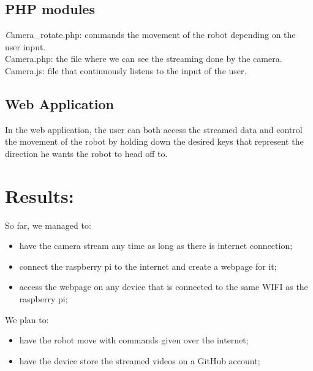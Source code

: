 \documentclass[a4paper,11pt]{article}
\begin{document}
\subsection{PHP modules}

\textit 
Camera\_rotate.php: commands the movement of the robot depending on the user input. \\

Camera.php: the file where we can see the streaming done by the camera. \\

Camera.js: file that continuously listens to the input of the user. \\

\subsection{Web Application}

In the web application, the user can both access the streamed data and control the movement of the robot by holding down the desired keys that represent the direction he wants the robot to head off to.

\newpage


\section{Results:}

So far, we managed to:
\begin{itemize}  
\item have the camera stream any time as long as there is internet connection;
\item connect the raspberry pi to the internet and create a webpage for it;
\item access the webpage on any device that is connected to the same WIFI as the raspberry
pi;\\
\end{itemize}

We plan to:
\begin{itemize}  
\item have the robot move with commands given over the internet;
\item have the device store the streamed videos on a GitHub account;
\end{itemize}

\newpage
\end{document}
